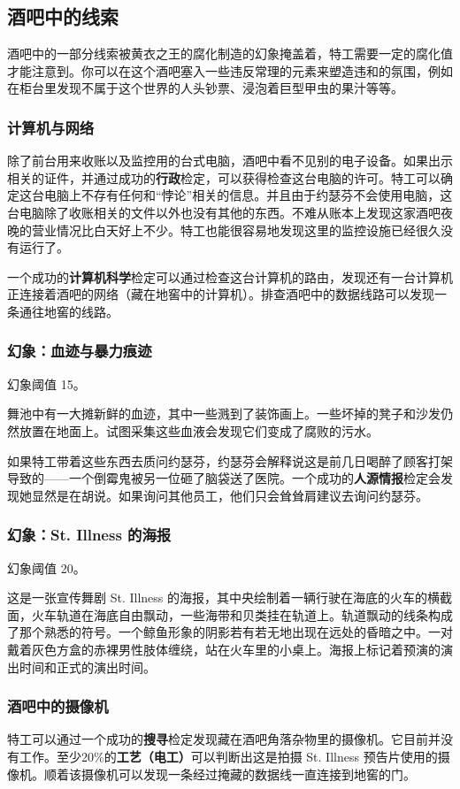 \subsection{酒吧中的线索}
酒吧中的一部分线索被黄衣之王的腐化制造的幻象掩盖着，特工需要一定的腐化值才能注意到。你可以在这个酒吧塞入一些违反常理的元素来塑造违和的氛围，例如在柜台里发现不属于这个世界的人头钞票、浸泡着巨型甲虫的果汁等等。

\subsubsection{计算机与网络}
除了前台用来收账以及监控用的台式电脑，酒吧中看不见别的电子设备。如果出示相关的证件，并通过成功的\textbf{行政}检定，可以获得检查这台电脑的许可。特工可以确定这台电脑上不存有任何和“悖论”相关的信息。并且由于约瑟芬不会使用电脑，这台电脑除了收账相关的文件以外也没有其他的东西。不难从账本上发现这家酒吧夜晚的营业情况比白天好上不少。特工也能很容易地发现这里的监控设施已经很久没有运行了。

一个成功的\textbf{计算机科学}检定可以通过检查这台计算机的路由，发现还有一台计算机正连接着酒吧的网络（藏在地窖中的计算机）。排查酒吧中的数据线路可以发现一条通往地窖的线路。

\subsubsection{幻象：血迹与暴力痕迹}
幻象阈值 15。

舞池中有一大摊新鲜的血迹，其中一些溅到了装饰画上。一些坏掉的凳子和沙发仍然放置在地面上。试图采集这些血液会发现它们变成了腐败的污水。

如果特工带着这些东西去质问约瑟芬，约瑟芬会解释说这是前几日喝醉了顾客打架导致的——一个倒霉鬼被另一位砸了脑袋送了医院。一个成功的\textbf{人源情报}检定会发现她显然是在胡说。如果询问其他员工，他们只会耸耸肩建议去询问约瑟芬。

\subsubsection{幻象：St. Illness 的海报}
幻象阈值 20。

这是一张宣传舞剧 St. Illness 的海报，其中央绘制着一辆行驶在海底的火车的横截面，火车轨道在海底自由飘动，一些海带和贝类挂在轨道上。轨道飘动的线条构成了那个熟悉的符号。一个鲸鱼形象的阴影若有若无地出现在远处的昏暗之中。一对戴着灰色方盒的赤裸男性肢体缠绕，站在火车里的小桌上。海报上标记着预演的演出时间和正式的演出时间。

\subsubsection{酒吧中的摄像机}
特工可以通过一个成功的\textbf{搜寻}检定发现藏在酒吧角落杂物里的摄像机。它目前并没有工作。至少20\%的\textbf{工艺（电工）}可以判断出这是拍摄 St. Illness 预告片使用的摄像机。顺着该摄像机可以发现一条经过掩藏的数据线一直连接到地窖的门。

